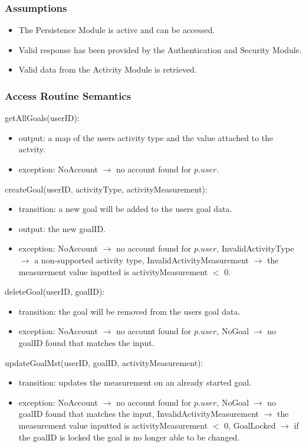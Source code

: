 \documentclass[12pt, titlepage]{article}
\begin{document}
\subsubsection{Assumptions}
\begin{itemize}
    \item The Persistence Module is active and can be accessed.
    \item Valid response has been provided by the Authentication and Security Module.
    \item Valid data from the Activity Module is retrieved.
\end{itemize}

\subsubsection{Access Routine Semantics}

\noindent getAllGoals(userID):
\begin{itemize}
\item output: a map of the users activity type and the value attached to the actvity.
\item exception: NoAccount $\longrightarrow$ no account found for $p.\mathit{user}$.
\end{itemize}

\noindent createGoal(userID, activityType, activityMeasurement):
\begin{itemize}
\item transition: a new goal will be added to the users goal data. 
\item output: the new goalID.
\item exception: NoAccount $\longrightarrow$ no account found for $p.\mathit{user}$, InvalidActivityType $\longrightarrow$ a non-supported activity type, InvalidActivityMeasurement $\longrightarrow$ the measurement value inputted is activityMeasurement $<$ 0.
\end{itemize}

\noindent deleteGoal(userID, goalID):
\begin{itemize}
\item transition: the goal will be removed from the users goal data. 
\item exception: NoAccount $\longrightarrow$ no account found for $p.\mathit{user}$, NoGoal $\longrightarrow$ no goalID found that matches the input.
\end{itemize}

\noindent updateGoalMst(userID, goalID, activityMeasurement):
\begin{itemize}
\item transition: updates the measurement on an already started goal. 
\item exception: NoAccount $\longrightarrow$ no account found for $p.\mathit{user}$, NoGoal $\longrightarrow$ no goalID found that matches the input, InvalidActivityMeasurement $\longrightarrow$ the measurement value inputted is activityMeasurement $<$ 0, GoalLocked $\longrightarrow$ if the goalID is locked the goal is no longer able to be changed.
\end{itemize}
\end{document}
